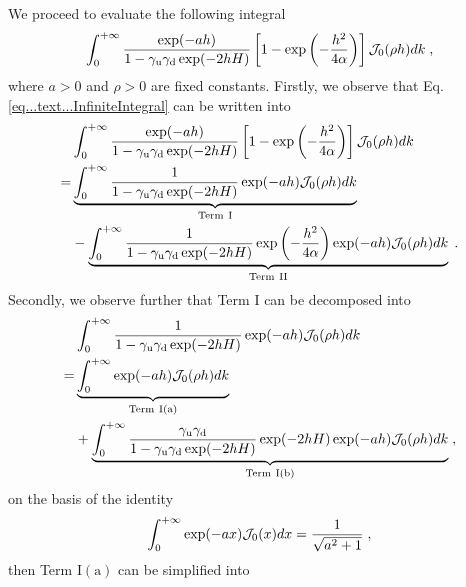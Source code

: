 We proceed to evaluate the following integral
\begin{equation}\label{eq...text...InfiniteIntegral}
\int_0^{+\infty} \frac{ \exp(-ah)}{1-\gamma_{\mathrm{u}}\gamma_{\mathrm{d}}\exp(-2hH)} \left[1-\exp\left(-\frac{h^2}{4\alpha}\right)\right]\mathcal{J}_0(\rho h)d k\;,    
\end{equation}
where $a>0$ and $\rho>0$ are fixed constants. Firstly, we observe that Eq. \eqref{eq...text...InfiniteIntegral} can be written into
\begin{align*}
   & \int_0^{+\infty} \frac{ \exp(-ah)}{1-\gamma_{\mathrm{u}}\gamma_{\mathrm{d}}\exp(-2hH)} \left[1-\exp\left(-\frac{h^2}{4\alpha}\right)\right]\mathcal{J}_0(\rho h)d k\\
   =&\underbrace{\int_0^{+\infty} \frac{1}{1-\gamma_{\mathrm{u}}\gamma_{\mathrm{d}}\exp(-2hH)}  \exp(-ah) \mathcal{J}_0(\rho h)d k}_{\text{Term}~\mathrm{I}}\\
   &-\underbrace{\int_0^{+\infty} \frac{1}{1-\gamma_{\mathrm{u}}\gamma_{\mathrm{d}}\exp(-2hH)}\exp\left(-\frac{h^2}{4\alpha}\right)  \exp(-ah) \mathcal{J}_0(\rho h)d k}_{\text{Term}~\mathrm{II}}\;.
\end{align*}
Secondly, we observe further that Term $\mathrm{I}$ can be decomposed into
\begin{align*}
&\int_0^{+\infty} \frac{1}{1-\gamma_{\mathrm{u}}\gamma_{\mathrm{d}}\exp(-2hH)}  \exp(-ah) \mathcal{J}_0(\rho h)d k\\
=&\underbrace{\int_0^{+\infty}   \exp(-ah) \mathcal{J}_0(\rho h)d k}_{\text{Term}~\mathrm{I(a)}}\\
&+\underbrace{\int_0^{+\infty} \frac{\gamma_{\mathrm{u}}\gamma_{\mathrm{d}}}{1-\gamma_{\mathrm{u}}\gamma_{\mathrm{d}}\exp(-2hH)}  \exp(-2hH)\exp(-ah) \mathcal{J}_0(\rho h)d k}_{\text{Term}~\mathrm{I(b)}}\;,
\end{align*}
on the basis of the identity
\begin{equation*}
    \int_0^{+\infty}\exp(-ax)\mathcal{J}_0(x)d x=\frac{1}{\sqrt{a^2+1}}\;,
\end{equation*}
then Term $\mathrm{I(a)}$ can be simplified into 
